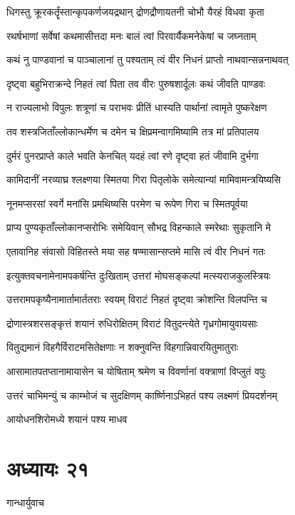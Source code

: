\twolineshloka
{धिगस्तु क्रूरकर्तॄंस्तान्कृपकर्णजयद्रथान्}
{द्रोणद्रौणायतनी चोभौ यैरहं विधवा कृता}


\twolineshloka
{रथर्षभाणां सर्वेषां कथमासीत्तदा मनः}
{बालं त्वां पिरवार्यैकमनेकेषां च जघ्नताम्}


\twolineshloka
{कथं नु पाण्डवानां च पाञ्चालानां तु पश्यताम्}
{त्वं वीर निधनं प्राप्तो नाथवान्सन्ननाथवत्}


\twolineshloka
{दृष्ट्वा बहुभिराक्रन्दे निहतं त्वां पिता तव}
{वीरः पुरुषशार्दूलः कथं जीवति पाण्डवः}


\twolineshloka
{न राज्यलाभो विपुलः शत्रूणां च पराभवः}
{प्रीतिं धास्यति पार्थानां त्वामृते पुष्करेक्षण}


\twolineshloka
{तव शस्त्रजिताँल्लोकान्धर्मेण च दमेन च}
{क्षिप्रमन्वागमिष्यामि तत्र मां प्रतिपालय}


\twolineshloka
{दुर्मरं पुनरप्राप्ते काले भवति केनचित्}
{यदहं त्वां रणे दृष्ट्वा हतं जीवामि दुर्भगा}


\twolineshloka
{कामिदानीं नरव्याघ्र श्लक्ष्णया स्मितया गिरा}
{पितृलोके समेत्यान्यां मामिवामन्त्रयिष्यसि}


\twolineshloka
{नूनमप्सरसां स्वर्गे मनांसि प्रमथिष्यसि}
{परमेण च रूपेण गिरा च स्मितपूर्वया}


\twolineshloka
{प्राप्य पुण्यकृताँल्लोकानप्सरोभिः समेयिवान्}
{सौभद्र विहन्काले स्मरेथाः सुकृतानि मे}


\twolineshloka
{एतावानिह संवासो विहितस्ते मया सह}
{षण्मासान्सप्तमे मासि त्वं वीर निधनं गतः}


\twolineshloka
{इत्युक्तवचनामेनामपकर्षन्ति दुःखिताम्}
{उत्तरां मोघसङ्कल्पां मत्स्यराजकुलस्त्रियः}


\twolineshloka
{उत्तरामपकृष्यैनामार्तामार्ततराः स्वयम्}
{विराटं निहतं दृष्ट्वा क्रोशन्ति विलपन्ति च}


\twolineshloka
{द्रोणास्त्रशरसङ्कृत्तं शयानं रुधिरोक्षितम्}
{विराटं वितुदन्त्येते गृध्रगोमायुवायसाः}


\twolineshloka
{वितुद्यमानं विहगैर्विराटमसितेक्षणाः}
{न शक्नुवन्ति विहगान्निवारयितुमातुराः}


\twolineshloka
{आसामातपतप्तानामायासेन च योषिताम्}
{श्रमेण च विवर्णानां वक्त्राणां विप्लुतं वपुः}


\threelineshloka
{उत्तरं चाभिमन्युं च काम्भोजं च सुदक्षिणम्}
{कार्ष्णिनाऽभिहतं पश्य लक्ष्मणं प्रियदर्शनम्}
{}


आयोधनशिरोमध्ये शयानं पश्य माधव
\chapter{अध्यायः २१}
\twolineshloka
{गान्धार्युवाच}
{}


